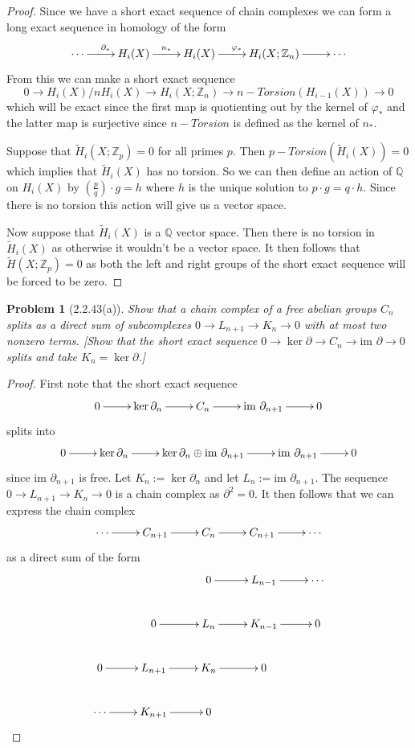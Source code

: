 \documentclass[10pt]{article}
\newcommand{\sk}{\vskip 10mm}
\newcommand{\bb}[1]{\mathbb{#1}}
\newcommand{\rH}{\widetilde{H}}
\theoremstyle{plain}
\newtheorem{problem}{Problem}
\theoremstyle{remark}
\begin{document}
\begin{proof}
  Since we have a short exact sequence of chain complexes we can form
  a long exact sequence in homology of the form
  \[
    \xymatrix{
      \cdots \ar[r]^{\partial_*} & H_i(X) \ar[r]^{n_*} & H_i(X) \ar[r]^{\varphi_*} & H_i(X;\bb{Z}_n) \ar[r] & \cdots
    }
  \]
  From this we can make a short exact sequence
  \[
    0\rightarrow H_i(X)/nH_i(X)\rightarrow H_i(X;\bb{Z}_n)\rightarrow n-Torsion(H_{i-1}(X))\rightarrow 0
  \]
  which will be exact since the first map is quotienting out by the kernel of $\varphi_*$ and
  the latter map is surjective since $n-Torsion$ is defined as the kernel of $n_*$.

  Suppose that $\rH_i(X;\bb{Z}_p)=0$ for all primes $p$. Then $p-Torsion(\rH_i(X))=0$ which
  implies that $\rH_i(X)$ has no torsion. So we can then define an action of $\bb{Q}$ on
  $H_i(X)$ by $(\frac{p}{q})\cdot g = h$ where $h$ is the unique solution to $p\cdot g=q\cdot h$.
  Since there is no torsion this action will give us a vector space.

  Now suppose that $\rH_i(X)$ is a $\bb{Q}$ vector space. Then there is no torsion in
  $\rH_i(X)$ as otherwise it wouldn't be a vector space. It then follows that $\rH(X;\bb{Z}_p)=0$
  as both the left and right groups of the short exact sequence will be forced to be zero.
\end{proof}

\sk

\begin{problem}[2.2.43(a)]
  Show that a chain complex of a free abelian groups $C_n$ splits as a
  direct sum of subcomplexes $0\rightarrow L_{n+1}\rightarrow K_n\rightarrow 0$
  with at most two nonzero terms. [Show that the short exact sequence
  $0\rightarrow\ker\partial\rightarrow C_n\rightarrow\text{im\ }\partial\rightarrow 0$
  splits and take $K_n=\ker\partial$.]
\end{problem}

\begin{proof}
  First note that the short exact sequence
  \[
    \xymatrix{
      0\ar[r] & \ker\partial_n\ar[r] & C_n \ar[r] & \text{im\ }\partial_{n+1} \ar[r] & 0
    }
  \]
  splits into
  \[
    \xymatrix{
      0\ar[r] & \ker\partial_n\ar[r] & \ker\partial_n\oplus\text{im\ }\partial_{n+1} \ar[r] & \text{im\ }\partial_{n+1} \ar[r] & 0
    }
  \]
  since $\text{im\ }\partial_{n+1}$ is free. Let $K_n:=\ker\partial_n$ and let $L_n:=\text{im\ }\partial_{n+1}$.
  The sequence $0\rightarrow L_{n+1}\rightarrow K_n\rightarrow 0$ is a chain complex as $\partial^2=0$. It then follows that we
  can express the chain complex
  \[
    \xymatrix{
      \cdots \ar[r] & C_{n+1} \ar[r] & C_n \ar[r] & C_{n+1} \ar[r] & \cdots
    }
  \]
  as a direct sum of the form
  \[
    \xymatrix{
      & & 0 \ar[r] & L_{n-1} \ar[r] & \cdots\\
      & 0 \ar[r] & L_n \ar[r] & K_{n-1} \ar[r] & 0\\
      0 \ar[r] & L_{n+1} \ar[r] & K_n \ar[r] & 0 &\\
      \cdots \ar[r] & K_{n+1} \ar[r] & 0 & &\\
    }
  \]
\end{proof}
\end{document}
